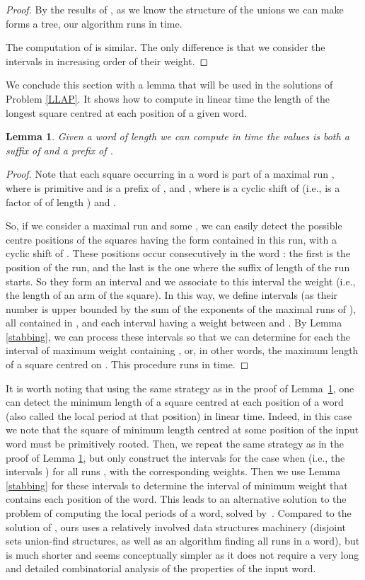 \documentclass[final]{dmtcs-episciences}
\newtheorem{lemma}{Lemma}
\begin{document}
\begin{proof}
By the results of \cite{Gabow83}, as we know the structure of the unions we can make forms a tree, our algorithm runs in  time. 

The computation of  is similar. The only difference is that we consider the intervals in increasing order of their weight.
\end{proof}


We conclude this section with a lemma that will be used in the solutions of Problem \ref{LLAP}. It shows how to compute in linear time the length of the longest square centred at each position of a given word. 
\begin{lemma}\label{centred_squares}
Given a word  of length  we can compute in  time the values  is both a suffix of  and a prefix of .
\end{lemma}
\begin{proof}
Note that each square  occurring in a word  is part of a maximal run , where  is primitive and  is a prefix of , and , where  is a cyclic shift of  (i.e.,  is a factor of  of length ) and . 

So, if we consider a maximal run  and some , we can easily detect the possible centre positions of the squares having the form  contained in this run, with  a cyclic shift of . These positions occur consecutively in the word : the first is the  position of the run, and the last is the one where the suffix of length  of the run starts. So they form an interval  and we associate to this interval the weight  (i.e., the length of an arm of the square). In this way, we define  intervals (as their number is upper bounded by the sum of the exponents of the maximal runs of ), all contained in , and each interval having a weight between  and . By Lemma \ref{stabbing}, we can process these intervals so that we can determine for each  the interval of maximum weight containing , or, in other words, the maximum length  of a square centred on . This procedure runs in  time. 
 \end{proof}

It is worth noting that using the same strategy as in the proof of Lemma~\ref{centred_squares}, one can detect the minimum length of a square centred at each position of a word (also called the local period at that position) in linear time. Indeed, in this case we note that the square of minimum length centred at some position of the input word must be primitively rooted. Then, we repeat the same strategy as in the proof of Lemma \ref{centred_squares}, but only construct the intervals  for the case when  (i.e., the intervals ) for all runs , with the corresponding weights. Then we use Lemma \ref{stabbing} for these intervals to determine the interval of minimum weight that contains each position of the word.
This leads to an alternative solution to the problem of computing the local periods of a word, solved by~\cite{MFCS_Lecroq}. Compared to the solution of \cite{MFCS_Lecroq}, ours uses a relatively involved data structures machinery (disjoint sets union-find structures, as well as an algorithm finding all runs in a word), but is much shorter and seems conceptually simpler as it does not require a very long and detailed combinatorial analysis of the properties of the input word. 
\end{document}
